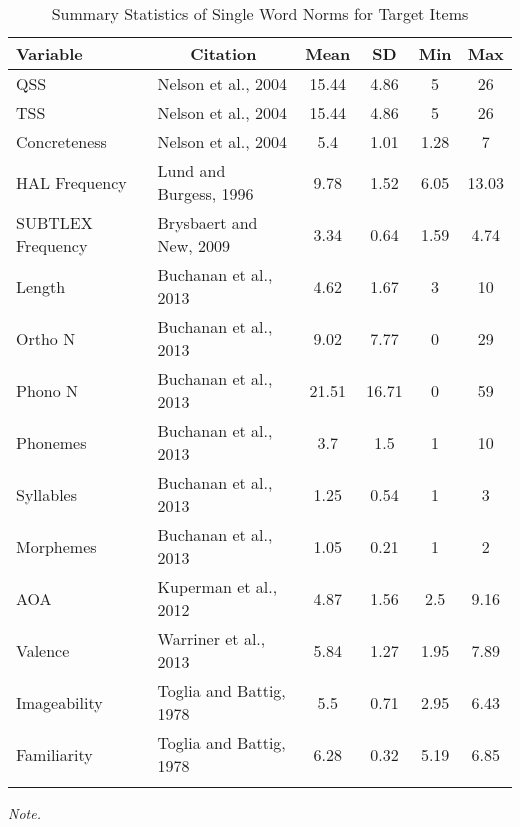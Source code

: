 \documentclass[english,man]{apa6}
\theoremstyle{definition}
\theoremstyle{definition}
\theoremstyle{remark}
\begin{document}
\begin{table}[tbp]
\begin{center}
\begin{threeparttable}
\caption{\label{tab:unnamed-chunk-3}Summary Statistics of Single Word Norms for Target Items}
\begin{tabular}{llcccc}
\toprule
Variable & \multicolumn{1}{c}{Citation} & \multicolumn{1}{c}{Mean} & \multicolumn{1}{c}{SD} & \multicolumn{1}{c}{Min} & \multicolumn{1}{c}{Max}\\
\midrule
QSS & Nelson et al., 2004 & 15.44 & 4.86 & 5 & 26\\
TSS & Nelson et al., 2004 & 15.44 & 4.86 & 5 & 26\\
Concreteness & Nelson et al., 2004 & 5.4 & 1.01 & 1.28 & 7\\
HAL Frequency & Lund and Burgess, 1996 & 9.78 & 1.52 & 6.05 & 13.03\\
SUBTLEX Frequency & Brysbaert and New, 2009 & 3.34 & 0.64 & 1.59 & 4.74\\
Length & Buchanan et al., 2013 & 4.62 & 1.67 & 3 & 10\\
Ortho N & Buchanan et al., 2013 & 9.02 & 7.77 & 0 & 29\\
Phono N & Buchanan et al., 2013 & 21.51 & 16.71 & 0 & 59\\
Phonemes & Buchanan et al., 2013 & 3.7 & 1.5 & 1 & 10\\
Syllables & Buchanan et al., 2013 & 1.25 & 0.54 & 1 & 3\\
Morphemes & Buchanan et al., 2013 & 1.05 & 0.21 & 1 & 2\\
AOA & Kuperman et al., 2012 & 4.87 & 1.56 & 2.5 & 9.16\\
Valence & Warriner et al., 2013 & 5.84 & 1.27 & 1.95 & 7.89\\
Imageability & Toglia and Battig, 1978 & 5.5 & 0.71 & 2.95 & 6.43\\
Familiarity & Toglia and Battig, 1978 & 6.28 & 0.32 & 5.19 & 6.85\\
\bottomrule
\addlinespace
\end{tabular}
\begin{tablenotes}[para]
\textit{Note.} 
\end{tablenotes}
\end{threeparttable}
\end{center}
\end{table}
\end{document}
